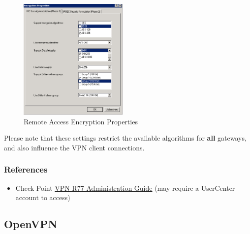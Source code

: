 \begin{figure}[p]
  \centering
  \includegraphics[width=0.474\textwidth]{img/checkpoint_4.png}
  \caption{Remote Access Encryption Properties}
  \label{fig:checkpoint_4}
\end{figure}

Please note that these settings restrict the available algorithms for
\textbf{all} gateways, and also influence the VPN client connections.



\subsubsection{References}
\begin{itemize}
\item Check Point
  \href{https://sc1.checkpoint.com/documents/R77/CP_R77_VPN_AdminGuide/html_frameset.htm}{VPN R77 Administration Guide} (may require a UserCenter account to access)
\end{itemize}



\subsection{OpenVPN}


